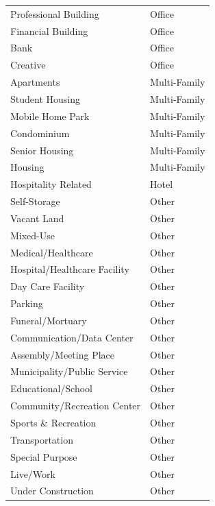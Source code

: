 \documentclass[
  12pt]{article}
\begin{document}
\begin{longtable}[]{@{}ll@{}}
Professional Building & Office \\
Financial Building & Office \\
Bank & Office \\
Creative & Office \\
Apartments & Multi-Family \\
Student Housing & Multi-Family \\
Mobile Home Park & Multi-Family \\
Condominium & Multi-Family \\
Senior Housing & Multi-Family \\
Housing & Multi-Family \\
Hospitality Related & Hotel \\
Self-Storage & Other \\
Vacant Land & Other \\
Mixed-Use & Other \\
Medical/Healthcare & Other \\
Hospital/Healthcare Facility & Other \\
Day Care Facility & Other \\
Parking & Other \\
Funeral/Mortuary & Other \\
Communication/Data Center & Other \\
Assembly/Meeting Place & Other \\
Municipality/Public Service & Other \\
Educational/School & Other \\
Community/Recreation Center & Other \\
Sports \& Recreation & Other \\
Transportation & Other \\
Special Purpose & Other \\
Live/Work & Other \\
Under Construction & Other \\
\end{longtable}
\end{document}
